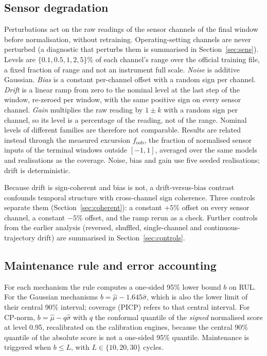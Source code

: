 \documentclass[11pt,a4paper]{article}
\begin{document}
\subsection{Sensor degradation}
Perturbations act on the raw readings of the sensor channels of the final window before normalisation, without retraining. Operating-setting channels are never perturbed (a diagnostic that perturbs them is summarised in Section~\ref{sec:sens}). Levels are $\{0.1,0.5,1,2,5\}\%$ of each channel's range over the official training file, a fixed fraction of range and not an instrument full scale. \emph{Noise} is additive Gaussian. \emph{Bias} is a constant per-channel offset with a random sign per channel. \emph{Drift} is a linear ramp from zero to the nominal level at the last step of the window, re-zeroed per window, with the same positive sign on every sensor channel. \emph{Gain} multiplies the raw reading by $1\pm k$ with a random sign per channel, so its level is a percentage of the reading, not of the range. Nominal levels of different families are therefore not comparable. Results are related instead through the measured excursion $f_{\mathrm{oob}}$, the fraction of normalised sensor inputs of the terminal windows outside $[-1,1]$, averaged over the same models and realisations as the coverage. Noise, bias and gain use five seeded realisations; drift is deterministic.

Because drift is sign-coherent and bias is not, a drift-versus-bias contrast confounds temporal structure with cross-channel sign coherence. Three controls separate them (Section~\ref{sec:coherent}): a constant $+5\%$ offset on every sensor channel, a constant $-5\%$ offset, and the ramp rerun as a check. Further controls from the earlier analysis (reversed, shuffled, single-channel and continuous-trajectory drift) are summarised in Section~\ref{sec:controls}.

\subsection{Maintenance rule and error accounting}
For each mechanism the rule computes a one-sided 95\% lower bound $b$ on RUL. For the Gaussian mechanisms $b=\hat\mu-1.645\hat\sigma$, which is also the lower limit of their central 90\% interval; coverage (PICP) refers to that central interval. For CP-norm, $b=\hat\mu-q\hat\sigma$ with $q$ the conformal quantile of the \emph{signed} normalised score at level 0.95, recalibrated on the calibration engines, because the central 90\% quantile of the absolute score is not a one-sided 95\% quantile. Maintenance is triggered when $b\le L$, with $L\in\{10,20,30\}$ cycles.
\end{document}
